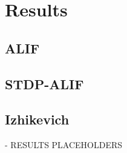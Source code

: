 \chapter{Results}\label{ch:results}

\section{ALIF}

\section{STDP-ALIF}

\section{Izhikevich}

\begin{tcolorbox}[colback=orange]
- RESULTS PLACEHOLDERS

\end{tcolorbox}
